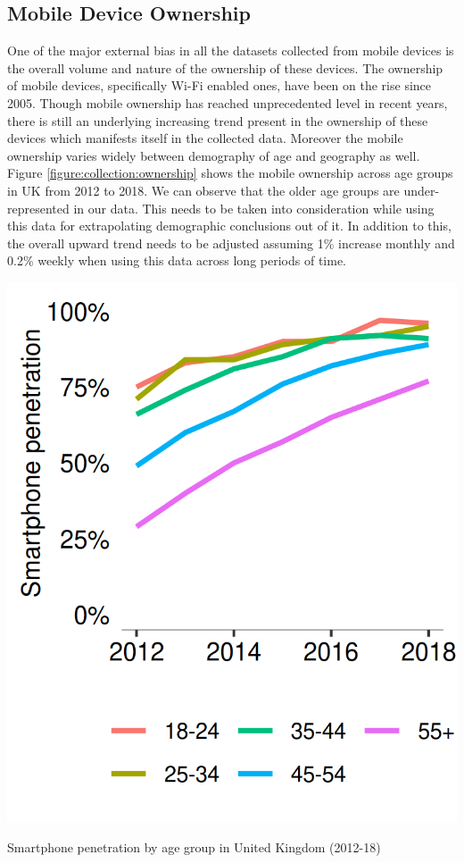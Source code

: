 \subsection{Mobile Device Ownership}
One of the major external bias in all the datasets collected from mobile devices is the overall volume and nature of the ownership of these devices.
The ownership of mobile devices, specifically Wi-Fi enabled ones, have been on the rise since 2005.
Though mobile ownership has reached unprecedented level in recent years, there is still an underlying increasing trend present in the ownership of these devices which manifests itself in the collected data.
Moreover the mobile ownership varies widely between demography of age and geography as well. 
Figure \ref{figure:collection:ownership} shows the mobile ownership across age groups in UK from 2012 to 2018.
We can observe that the older age groups are under-represented in our data.
This needs to be taken into consideration while using this data for extrapolating demographic conclusions out of it.
In addition to this, the overall upward trend needs to be adjusted assuming 1\% increase monthly and 0.2\% weekly when using this data across long periods of time.

\begin{marginfigure}
  \forceversofloat
  \includegraphics{images/mobile-ownership.png}
  \caption{Smartphone penetration by age group in United Kingdom (2012-18)}
  \label{figure:collection:ownership}
\end{marginfigure}



